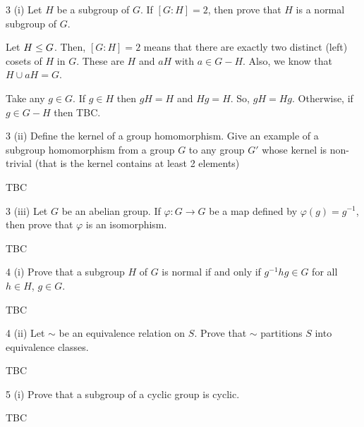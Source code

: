 \documentclass[11pt]{penrose}
\begin{document}
\begin{problem}{3 (i)}
    Let $H$ be a subgroup of $G$. If $[G:H]=2$, then prove that $H$ is a normal subgroup of $G$.

    \solution Let $H \mathrel{\leq} G$. Then, $[G:H]=2$ means that there are exactly two distinct (left) cosets of $H$ in $G$. These are $H$ and $aH$ with $a \in G-H$. Also, we know that $H \cup aH = G$.

    Take any $g \in G$. If $g \in H$ then $gH = H$ and $Hg = H$. So, $gH = Hg$. Otherwise, if $g \in G-H$ then TBC.
\end{problem}

\begin{problem}{3 (ii)}
    Define the kernel of a group homomorphism. Give an example of a subgroup homomorphism from a group $G$ to any group $G'$ whose kernel is non-trivial (that is the kernel contains at least 2 elements)

    \solution TBC
\end{problem}

\begin{problem}{3 (iii)}
    Let $G$ be an abelian group. If $\varphi: G \to G$ be a map defined by $\varphi(g) = g^{-1}$, then prove that $\varphi$ is an isomorphism.

    \solution TBC
\end{problem}

\begin{problem}{4 (i)}
    Prove that a subgroup $H$ of $G$ is normal if and only if $g^{-1}hg \in G$ for all $h \in H$, $g \in G$.

    \solution TBC
\end{problem}

\begin{problem}{4 (ii)}
    Let $\sim$ be an equivalence relation on $S$. Prove that $\sim$ partitions $S$ into equivalence classes.

    \solution TBC
\end{problem}

\begin{problem}{5 (i)}
    Prove that a subgroup of a cyclic group is cyclic.

    \solution TBC
\end{problem}
\end{document}
